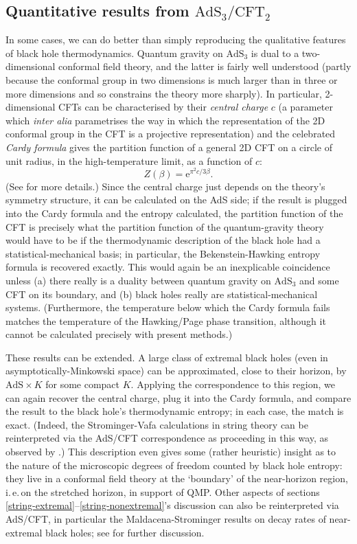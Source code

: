 \documentclass{article}
\newcommand{\iec}{\mbox{i.\,e.\,}}
\newcommand{\be}{\begin{equation}}
\newcommand{\ee}{\end{equation}}
\newcommand{\e}[1]{\mathrm{e}^{#1}}
\newcommand{\AdS}{\mathrm{AdS}}
\newcommand{\CFT}{\mathrm{CFT}}
\begin{document}
\subsection{Quantitative results from $\AdS_3/\CFT_2$}

In some cases, we can do better than simply reproducing the qualitative features of black hole thermodynamics. Quantum gravity on $\AdS_3$ is dual to a two-dimensional conformal field theory, and the latter is fairly well understood (partly because the conformal group in two dimensions is much larger than in three or more dimensions and so constrains the theory more sharply). In particular, 2-dimensional CFTs can be characterised by their \emph{central charge} $c$ (a parameter which \emph{inter alia} parametrises the way in which the representation of the 2D conformal group in the CFT is a projective representation) and the celebrated \emph{Cardy formula} \cite{cardyformula} gives the partition function of a general 2D CFT on a circle of unit radius, in the high-temperature limit, as a function of $c$:
\be
Z(\beta)=\e{\pi^2 c/3\beta}.
\ee
(See  for more details.)
Since the central charge just depends on the theory's symmetry structure, it can be calculated on the AdS side; if the result is plugged into the Cardy formula and the entropy calculated, the partition function of the CFT is precisely what the partition function of the quantum-gravity theory would have to be if the thermodynamic description of the black hole had a statistical-mechanical basis; in particular, the Bekenstein-Hawking entropy formula is recovered exactly. This would again be an inexplicable coincidence unless (a) there really is a duality between quantum gravity on $\AdS_3$ and some CFT on its boundary, and (b) black holes really are statistical-mechanical systems. (Furthermore, the temperature below which the Cardy formula fails matches the temperature of the Hawking/Page phase transition, although it cannot be calculated precisely with present methods.)

These results can be extended. A large class of extremal black holes (even in asymptotically-Minkowski space) can be approximated, close to their horizon, by $\AdS\times K$ for some compact $K$. Applying the correspondence to this region, we can again recover the central charge, plug it into the Cardy formula, and compare the result to the black hole's thermodynamic entropy; in each case, the match is exact. (Indeed, the Strominger-Vafa calculations in string theory can be reinterpreted via the AdS/CFT correspondence as proceeding in this way, as observed by .) This description even gives some (rather heuristic) insight as to the nature of the microscopic degrees of freedom counted by black hole entropy: they live in a conformal field theory at the `boundary' of the near-horizon region, \iec on the stretched horizon, in support of QMP. Other aspects of sections \ref{string-extremal}--\ref{string-nonextremal}'s discussion can also be reinterpreted via AdS/CFT, in particular the Maldacena-Strominger results on decay rates of near-extremal black holes; see  for further discussion.
\end{document}
